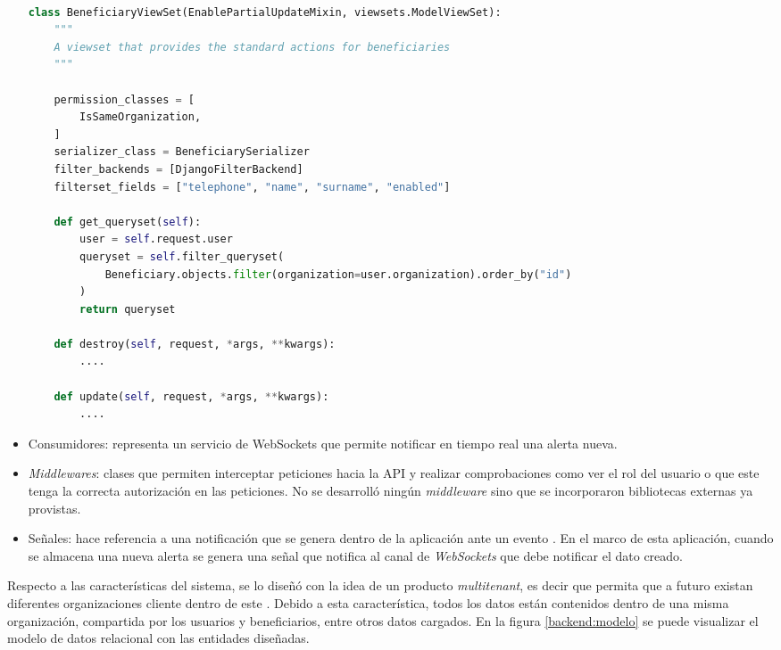 \begin{itemize}
\begin{lstlisting}[language=Python,label=backend:view1,caption=\textit{ViewSet} de la entidad \textit{Beneficiary}.]  % Start your code-block

class BeneficiaryViewSet(EnablePartialUpdateMixin, viewsets.ModelViewSet):
    """
    A viewset that provides the standard actions for beneficiaries
    """

    permission_classes = [
        IsSameOrganization,
    ]
    serializer_class = BeneficiarySerializer
    filter_backends = [DjangoFilterBackend]
    filterset_fields = ["telephone", "name", "surname", "enabled"]

    def get_queryset(self):
        user = self.request.user
        queryset = self.filter_queryset(
            Beneficiary.objects.filter(organization=user.organization).order_by("id")
        )
        return queryset

    def destroy(self, request, *args, **kwargs):
        ....

    def update(self, request, *args, **kwargs):
        ....
\end{lstlisting}	
	
    \item Consumidores: representa un servicio de WebSockets que permite notificar en tiempo real una alerta nueva.
    \item \textit{Middlewares}: clases que permiten interceptar peticiones hacia la API \citep{DJANGO:10} y realizar comprobaciones como ver el rol del usuario o que este tenga la correcta autorización en las peticiones. No se desarrolló ningún \textit{middleware} sino que se incorporaron bibliotecas externas ya provistas.
    \item Señales: hace referencia a una notificación que se genera dentro de la aplicación ante un evento \citep{DJANGO:11}. En el marco de esta aplicación, cuando se almacena una nueva alerta se genera una señal que notifica al canal de \textit{WebSockets} que debe notificar el dato creado.
\end{itemize}

Respecto a las características del sistema, se lo diseñó con la idea de un producto \textit{multitenant}, es decir que permita que a futuro existan diferentes organizaciones cliente dentro de este \citep{DJANGO:12}. Debido a esta característica, todos los datos están contenidos dentro de una misma organización, compartida por los usuarios y beneficiarios, entre otros datos cargados. En la figura \ref{backend:modelo} se puede visualizar el modelo de datos relacional con las entidades diseñadas.

